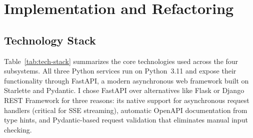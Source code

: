 \chapter{\label{chap:implementation}Implementation and Refactoring}

%
%
%

\section{Technology Stack}
\label{sec:tech-stack}

Table~\ref{tab:tech-stack} summarizes the core technologies used across the four subsystems. All three Python services run on Python~3.11 and expose their functionality through FastAPI, a modern asynchronous web framework built on Starlette and Pydantic. %
I chose FastAPI over alternatives like Flask or Django REST Framework for three reasons: its native support for asynchronous request handlers (critical for SSE streaming), automatic OpenAPI documentation from type hints, and Pydantic-based request validation that eliminates manual input checking.

